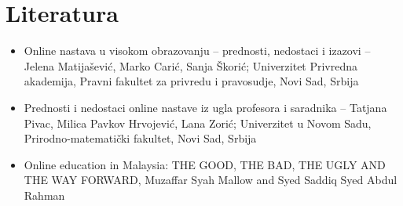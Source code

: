\documentclass{article}
\begin{document}
\newpage

\section{Literatura}
\begin{itemize}
    \item Online nastava u visokom obrazovanju – prednosti, nedostaci i izazovi – Jelena Matijašević, Marko Carić, Sanja Škorić; Univerzitet Privredna akademija, Pravni fakultet za privredu i pravosudje, Novi Sad, Srbija
    \item Prednosti i nedostaci online nastave iz ugla profesora i saradnika – Tatjana Pivac, Milica Pavkov Hrvojević, Lana Zorić; Univerzitet u Novom Sadu, Prirodno-matematički fakultet, Novi Sad, Srbija
    \item Online education in Malaysia: THE GOOD, THE BAD, THE UGLY AND THE WAY FORWARD, Muzaffar Syah Mallow and Syed Saddiq Syed Abdul Rahman
\end{itemize}
\end{document}
